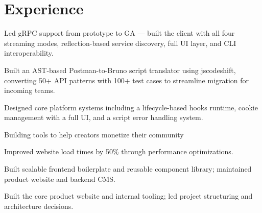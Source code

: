 \documentclass[]{deedy-resume-openfont}
\begin{document}
\hfill
\begin{minipage}[t]{0.66\textwidth} 


\section{Experience}
\vspace{\topsep} %
\begin{tightemize}
\item Led gRPC support from prototype to GA — built the client with all four streaming modes, reflection-based service discovery, full UI layer, and CLI interoperability.
\item Built an AST-based Postman-to-Bruno script translator using jscodeshift, converting 50+ API patterns with 100+ test cases to streamline migration for incoming teams.
\item Designed core platform systems including a lifecycle-based hooks runtime, cookie management with a full UI, and a script error handling system.
\end{tightemize}
\sectionsep

\vspace{\topsep} %
\begin{tightemize}
\item Building tools to help creators monetize their community
\end{tightemize}
\sectionsep

\begin{tightemize}
\item Improved website load times by 50\% through performance optimizations.
\item Built scalable frontend boilerplate and reusable component library; maintained product website and backend CMS.
\end{tightemize}
\sectionsep

Built the core product website and internal tooling; led project structuring and architecture decisions.
\sectionsep


\end{minipage}
\end{document}
